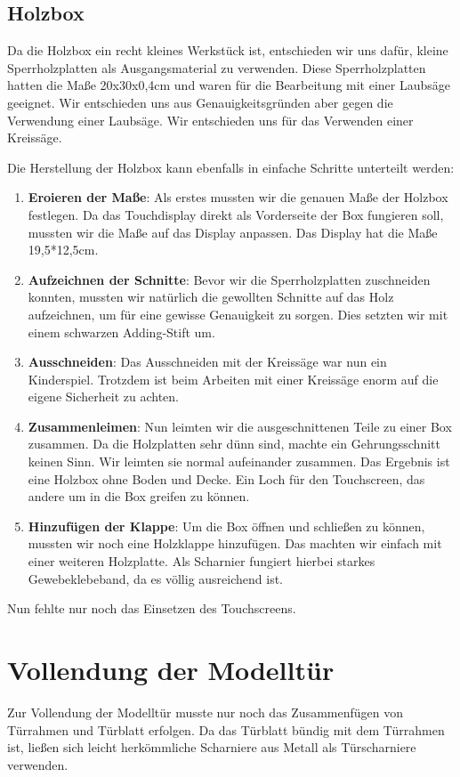 \subsection{Holzbox}
Da die Holzbox ein recht kleines Werkstück ist, entschieden wir uns dafür, kleine Sperrholzplatten als Ausgangsmaterial zu verwenden.
Diese Sperrholzplatten hatten die Maße 20x30x0,4cm und waren für die Bearbeitung mit einer Laubsäge geeignet. Wir entschieden uns aus
Genauigkeitsgründen aber gegen die Verwendung einer Laubsäge. Wir entschieden uns für das Verwenden einer Kreissäge.

Die Herstellung der Holzbox kann ebenfalls in einfache Schritte unterteilt werden:
\begin{enumerate}
    \item \textbf{Eroieren der Maße}: Als erstes mussten wir die genauen Maße der Holzbox festlegen. Da das Touchdisplay direkt als
    Vorderseite der Box fungieren soll, mussten wir die Maße auf das Display anpassen. Das Display hat die Maße 19,5*12,5cm.
    \item \textbf{Aufzeichnen der Schnitte}: Bevor wir die Sperrholzplatten zuschneiden konnten, mussten wir natürlich die gewollten
    Schnitte auf das Holz aufzeichnen, um für eine gewisse Genauigkeit zu sorgen. Dies setzten wir mit einem schwarzen Adding-Stift um.
    \item \textbf{Ausschneiden}: Das Ausschneiden mit der Kreissäge war nun ein Kinderspiel. Trotzdem ist beim Arbeiten mit einer Kreissäge
    enorm auf die eigene Sicherheit zu achten.
    \item \textbf{Zusammenleimen}: Nun leimten wir die ausgeschnittenen Teile zu einer Box zusammen. Da die Holzplatten sehr dünn sind,
    machte ein Gehrungsschnitt keinen Sinn. Wir leimten sie normal aufeinander zusammen. Das Ergebnis ist eine Holzbox ohne Boden und Decke.
    Ein Loch für den Touchscreen, das andere um in die Box greifen zu können.
    \item \textbf{Hinzufügen der Klappe}: Um die Box öffnen und schließen zu können, mussten wir noch eine Holzklappe hinzufügen. Das machten
    wir einfach mit einer weiteren Holzplatte. Als Scharnier fungiert hierbei starkes Gewebeklebeband, da es völlig ausreichend ist.
\end{enumerate}

Nun fehlte nur noch das Einsetzen des Touchscreens.


\section{Vollendung der Modelltür}
Zur Vollendung der Modelltür musste nur noch das Zusammenfügen von Türrahmen und Türblatt erfolgen.
Da das Türblatt bündig mit dem Türrahmen ist, ließen sich leicht herkömmliche Scharniere aus Metall als Türscharniere verwenden.

